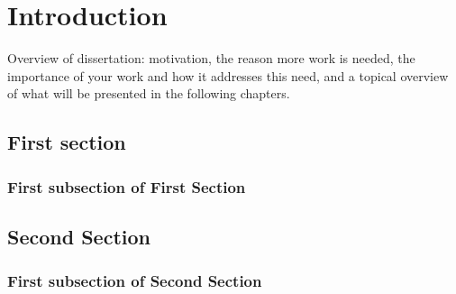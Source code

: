 \chapter[Intro]{Introduction}\label{chap:intro}

Overview of dissertation: motivation, the reason more work is needed, the importance of your work and how it addresses this need, and a topical overview of what will be presented in the following chapters.

\section{First section}

\subsection{First subsection of First Section}
\section{Second Section}
\subsection{First subsection of Second Section}
\endinput 